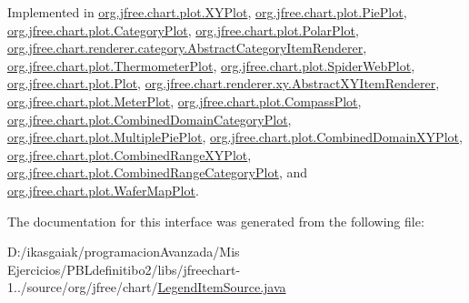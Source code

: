 Implemented in \mbox{\hyperlink{classorg_1_1jfree_1_1chart_1_1plot_1_1_x_y_plot_a6c69d52c6e874aa6c6a854951c8e0aa2}{org.\+jfree.\+chart.\+plot.\+X\+Y\+Plot}}, \mbox{\hyperlink{classorg_1_1jfree_1_1chart_1_1plot_1_1_pie_plot_a6bb041de79edb3351e574497d83f71cb}{org.\+jfree.\+chart.\+plot.\+Pie\+Plot}}, \mbox{\hyperlink{classorg_1_1jfree_1_1chart_1_1plot_1_1_category_plot_a35e0a11b3c2ec63f53262b47ab80abbe}{org.\+jfree.\+chart.\+plot.\+Category\+Plot}}, \mbox{\hyperlink{classorg_1_1jfree_1_1chart_1_1plot_1_1_polar_plot_a3581c61aafa174b1f10952d312a2c9d1}{org.\+jfree.\+chart.\+plot.\+Polar\+Plot}}, \mbox{\hyperlink{classorg_1_1jfree_1_1chart_1_1renderer_1_1category_1_1_abstract_category_item_renderer_a64baac5b575af71d3dfd90791764c1a9}{org.\+jfree.\+chart.\+renderer.\+category.\+Abstract\+Category\+Item\+Renderer}}, \mbox{\hyperlink{classorg_1_1jfree_1_1chart_1_1plot_1_1_thermometer_plot_a36b314aaada1e777a33202d88c1f9bba}{org.\+jfree.\+chart.\+plot.\+Thermometer\+Plot}}, \mbox{\hyperlink{classorg_1_1jfree_1_1chart_1_1plot_1_1_spider_web_plot_ab325d38f739c0d3816f3f43f21200635}{org.\+jfree.\+chart.\+plot.\+Spider\+Web\+Plot}}, \mbox{\hyperlink{classorg_1_1jfree_1_1chart_1_1plot_1_1_plot_ab6cb27f0e674cc0a3bab4d214cc70f5d}{org.\+jfree.\+chart.\+plot.\+Plot}}, \mbox{\hyperlink{classorg_1_1jfree_1_1chart_1_1renderer_1_1xy_1_1_abstract_x_y_item_renderer_a60a84ee4d03aaf31d79d984016ca4fc7}{org.\+jfree.\+chart.\+renderer.\+xy.\+Abstract\+X\+Y\+Item\+Renderer}}, \mbox{\hyperlink{classorg_1_1jfree_1_1chart_1_1plot_1_1_meter_plot_a45430436abd34bc809b0a96d01f1e213}{org.\+jfree.\+chart.\+plot.\+Meter\+Plot}}, \mbox{\hyperlink{classorg_1_1jfree_1_1chart_1_1plot_1_1_compass_plot_adc5fd675872d34dce951cb40937152bb}{org.\+jfree.\+chart.\+plot.\+Compass\+Plot}}, \mbox{\hyperlink{classorg_1_1jfree_1_1chart_1_1plot_1_1_combined_domain_category_plot_ab1f03919631fb01fcc9c420ad61bfdb2}{org.\+jfree.\+chart.\+plot.\+Combined\+Domain\+Category\+Plot}}, \mbox{\hyperlink{classorg_1_1jfree_1_1chart_1_1plot_1_1_multiple_pie_plot_ac0d250e515644283985aec95f5d639f6}{org.\+jfree.\+chart.\+plot.\+Multiple\+Pie\+Plot}}, \mbox{\hyperlink{classorg_1_1jfree_1_1chart_1_1plot_1_1_combined_domain_x_y_plot_a97116ae980d7a928848db0ce0c0bcbe7}{org.\+jfree.\+chart.\+plot.\+Combined\+Domain\+X\+Y\+Plot}}, \mbox{\hyperlink{classorg_1_1jfree_1_1chart_1_1plot_1_1_combined_range_x_y_plot_a5b4e754fb06e91d483aa6850c74a36a3}{org.\+jfree.\+chart.\+plot.\+Combined\+Range\+X\+Y\+Plot}}, \mbox{\hyperlink{classorg_1_1jfree_1_1chart_1_1plot_1_1_combined_range_category_plot_a37a115625695a3f6781d7d57e9eb9ac2}{org.\+jfree.\+chart.\+plot.\+Combined\+Range\+Category\+Plot}}, and \mbox{\hyperlink{classorg_1_1jfree_1_1chart_1_1plot_1_1_wafer_map_plot_a508d6ef7b05f37d308ab9ea5d3e5b84c}{org.\+jfree.\+chart.\+plot.\+Wafer\+Map\+Plot}}.



The documentation for this interface was generated from the following file\+:\begin{DoxyCompactItemize}
\item 
D\+:/ikasgaiak/programacion\+Avanzada/\+Mis Ejercicios/\+P\+B\+Ldefinitibo2/libs/jfreechart-\/1../source/org/jfree/chart/\mbox{\hyperlink{_legend_item_source_8java}{Legend\+Item\+Source.\+java}}\end{DoxyCompactItemize}
